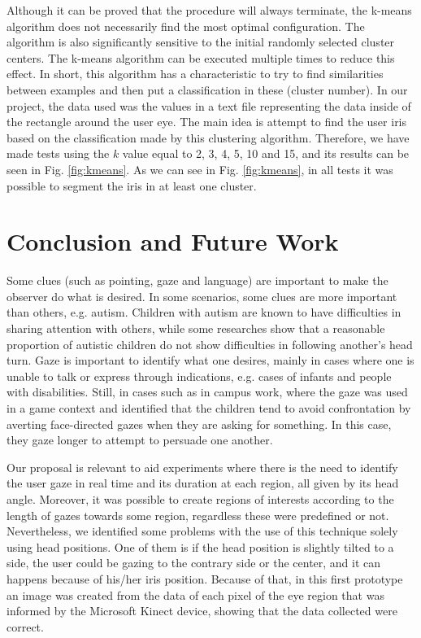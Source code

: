 \documentclass[10pt, conference]{IEEEtran}
\begin{document}
	Although it can be proved that the procedure will always terminate, the k-means algorithm does not necessarily find the most optimal configuration. 
	The algorithm is also significantly sensitive to the initial randomly selected cluster centers. 
	The k-means algorithm can be executed multiple times to reduce this effect.
	In short, this algorithm has a characteristic to try to find similarities between examples and then put a classification in these (cluster number). In our project, the data used was the values in a text file representing the data inside of the rectangle around the user eye. 
	The main idea is attempt to find the user iris based on the classification made by this clustering algorithm. 
	Therefore, we have made tests using the $k$ value equal to 2, 3, 4, 5, 10 and 15, and its results can be seen in Fig. \ref{fig:kmeans}.
	As we can see in Fig. \ref{fig:kmeans}, in all tests it was possible to segment the iris in at least one cluster.


\section{Conclusion and Future Work} \label{sec:conclusionAndFutureWork}
	Some clues (such as pointing, gaze and language) are important to make the observer do what is desired. 
	In some scenarios, some clues are more important than others, e.g. autism.
	Children with autism are known to have difficulties in sharing attention with others, while some researches \cite{14} show that a reasonable proportion of autistic children do not show difficulties in following another's head turn.
	Gaze is important to identify what one desires, mainly in cases where one is unable to talk or express through indications, e.g. cases of infants and people with disabilities.
	Still, in cases such as in campus work, where the gaze was used in a game context and identified that the children tend to avoid confrontation by averting face-directed gazes when they are asking for something. In this case, they gaze longer to attempt to persuade one another.

	Our proposal is relevant to aid experiments where there is the need to identify the user gaze in real time and its duration at each region, all given by its head angle.
	Moreover, it was possible to create regions of interests according to the length of gazes towards some region, regardless these were predefined or not.
	Nevertheless, we identified some problems with the use of this technique solely using head positions. 
	One of them is if the head position is slightly tilted to a side, the user could be gazing to the contrary side or the center, and it can happens because of his/her iris position. 
	Because of that, in this first prototype an image was created from the data of each pixel of the eye region that was informed by the Microsoft Kinect device, showing that the data collected were correct. 
\end{document}

